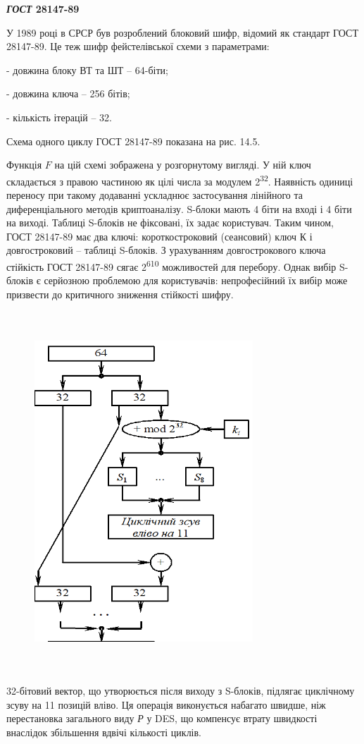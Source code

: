 \documentclass[a4paper]{article}
\newcounter{}
\begin{document}
\bigskip


\bigskip

{\centering\bfseries
\textit{ГОСТ }28147-89
\par}


\bigskip

У 1989 році в СРСР був розроблений блоковий шифр, відомий як стандарт ГОСТ
28147-89. Це теж шифр фейстелівської схеми з параметрами:

 {}- довжина блоку ВТ та ШТ – 64-біти; 

 {}-  довжина ключа – 256 бітів;

 {}-  кількість ітерацій – 32.

 Схема одного циклу\textit{ }ГОСТ\textit{ }28147-89 показана на рис. 14.5. 

Функція  ${F}$ на цій схемі зображена  у розгорнутому вигляді. У ній ключ
складається з правою частиною як цілі числа за модулем 2\textsuperscript{32}.
Наявність одиниці переносу при такому додаванні ускладнює застосування
лінійного та диференціального методів криптоаналізу. S-блоки мають 4 біти на
вході і 4 біти на  виході. Таблиці S-блоків не фіксовані, їх задає користувач.
Таким чином, ГОСТ 28147-89 має два ключі: короткостроковий (сеансовий) ключ К і
довгостроковий – таблиці S-блоків. З урахуванням довгострокового ключа
стійкість ГОСТ 28147-89 сягає  2\textsuperscript{610 } можливостей  для 
перебору.  Однак вибір S-блоків є серйозною проблемою для користувачів:
непрофесійний їх вибір може призвести до критичного зниження стійкості шифру.

\begin{figure}
\centering
\includegraphics[width=3.2319in,height=5.3154in]{crypt-img/crypt-img298.png}
\end{figure}
32-бітовий вектор, що утворюється після виходу з S-блоків, підлягає циклічному
зсуву на 11 позицій вліво. Ця операція виконується набагато швидше, ніж
перестановка загального виду \textit{Р} у DES, що компенсує втрату швидкості
внаслідок збільшення вдвічі кількості циклів.
\end{document}
